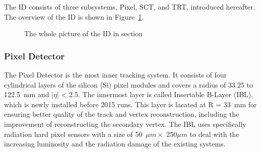The ID consists of three subsystems, Pixel, SCT, and TRT, introduced hereafter.
The overview of the ID is shown in Figure~\ref{fig:ID}.

\begin{figure}[tbp]
\begin{center}
\caption{
The whole picture of the ID in section
}
\label{fig:ID}
\end{center}
\end{figure}


\subsubsection{Pixel Detector}
The Pixel Detector is the most inner tracking system. It consists of four cylindrical layers of the silicon (Si) pixel modules and covers a radius of 33.25 to 122.5~mm and $|\eta|$ < 2.5.
The innermost layer is called Insertable B-Layer (IBL), which is newly installed before 2015 runs. This layer is lacated at R = 33~mm for ensuring better quality of the track and vertex reconstruction, including the improvement of reconstructing the secondary vertex.
The IBL uses specifically radiation hard pixel sensors with a size of 50~$\mu m \times$ 250$\mu m$ to deal with the increasing luminosity and the radiation damage of the existing systems. 

